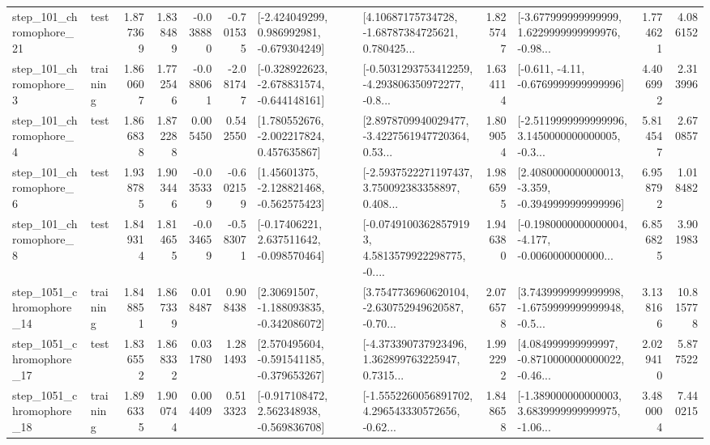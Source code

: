 \begin{tabular}{llrrrrllrlrr}
  step\_101\_chromophore\_21 &      test &      1.877369 &    1.838489 &     -0.038880 & -0.701535 &   [-2.424049299, 0.986992981, -0.679304249] &  [4.10687175734728, -1.68787384725621, 0.780425... &       1.825747 &  [-3.677999999999999, 1.6229999999999976, -0.98... &            1.774621 &          4.086152 \\
   step\_101\_chromophore\_3 &  training &      1.860607 &    1.772546 &     -0.088061 & -2.081747 &  [-0.328922623, -2.678831574, -0.644148161] &  [-0.5031293753412259, -4.293806350972277, -0.8... &       1.634114 &               [-0.611, -4.11, -0.6769999999999996] &            4.406992 &          2.313996 \\
   step\_101\_chromophore\_4 &      test &      1.866838 &    1.872288 &      0.005450 &  0.542550 &    [1.780552676, -2.002217824, 0.457635867] &  [2.8978709940029477, -3.4227561947720364, 0.53... &       1.809054 &  [-2.5119999999999996, 3.1450000000000005, -0.3... &            5.814547 &          2.670857 \\
   step\_101\_chromophore\_6 &      test &      1.938785 &    1.903446 &     -0.035339 & -0.602159 &    [1.45601375, -2.128821468, -0.562575423] &  [-2.5937522271197437, 3.750092383358897, 0.408... &       1.986595 &  [2.4080000000000013, -3.359, -0.3949999999999996] &            6.958792 &          1.018482 \\
   step\_101\_chromophore\_8 &      test &      1.849314 &    1.814655 &     -0.034659 & -0.583071 &    [-0.17406221, 2.637511642, -0.098570464] &  [-0.07491003628579193, 4.5813579922298775, -0.... &       1.946380 &  [-0.1980000000000004, -4.177, -0.0060000000000... &            6.856825 &          3.901983 \\
 step\_1051\_chromophore\_14 &  training &      1.848851 &    1.867339 &      0.018487 &  0.908438 &    [2.30691507, -1.188093835, -0.342086072] &  [3.7547736960620104, -2.630752949620587, -0.70... &       2.076578 &  [3.7439999999999998, -1.6759999999999948, -0.5... &            3.138166 &         10.815778 \\
 step\_1051\_chromophore\_17 &      test &      1.836552 &    1.868332 &      0.031780 &  1.281493 &   [2.570495604, -0.591541185, -0.379653267] &  [-4.373390737923496, 1.362899763225947, 0.7315... &       1.992292 &  [4.084999999999997, -0.8710000000000022, -0.46... &            2.029410 &          5.877522 \\
 step\_1051\_chromophore\_18 &  training &      1.896335 &    1.900744 &      0.004409 &  0.513323 &   [-0.917108472, 2.562348938, -0.569836708] &  [-1.5552260056891702, 4.296543330572656, -0.62... &       1.848658 &  [-1.389000000000003, 3.6839999999999975, -1.06... &            3.480004 &          7.440215 \\

\end{tabular}
